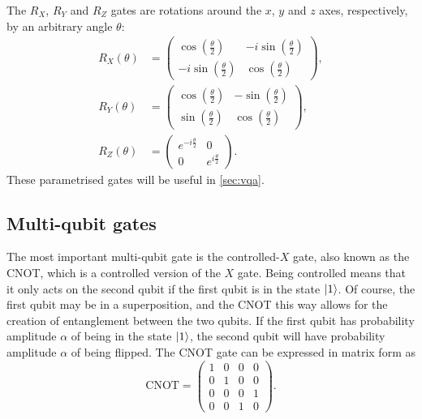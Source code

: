 The $R_X$, $R_Y$ and $R_Z$ gates are rotations around the $x$, $y$ and $z$ axes, respectively, by an arbitrary angle $\theta$:
\begin{align*}
    R_X(\theta) & = \begin{pmatrix} \cos\left(\frac{\theta}{2}\right) & -i \sin\left(\frac{\theta}{2}\right) \\ -i \sin\left(\frac{\theta}{2}\right) & \cos\left(\frac{\theta}{2}\right) \end{pmatrix}, \\
    R_Y(\theta) & = \begin{pmatrix} \cos\left(\frac{\theta}{2}\right) & -\sin\left(\frac{\theta}{2}\right) \\ \sin\left(\frac{\theta}{2}\right) & \cos\left(\frac{\theta}{2}\right) \end{pmatrix},      \\
    R_Z(\theta) & = \begin{pmatrix} e^{-i\frac{\theta}{2}} & 0 \\ 0 & e^{i\frac{\theta}{2}} \end{pmatrix}.
\end{align*}
These parametrised gates will be useful in \cref{sec:vqa}.

\subsection{Multi-qubit gates}
The most important multi-qubit gate is the controlled-$X$ gate, also known as the CNOT, which is a controlled version of the $X$ gate.
Being controlled means that it only acts on the second qubit if the first qubit is in the state $\ket{1}$.
Of course, the first qubit may be in a superposition, and the CNOT this way allows for the creation of entanglement between the two qubits.
If the first qubit has probability amplitude $\alpha$ of being in the state $\ket{1}$, the second qubit will have probability amplitude $\alpha$ of being flipped.
The CNOT gate can be expressed in matrix form as
\begin{equation}
    \text{CNOT} = \begin{pmatrix} 1 & 0 & 0 & 0 \\ 0 & 1 & 0 & 0 \\ 0 & 0 & 0 & 1 \\ 0 & 0 & 1 & 0 \end{pmatrix}.
\end{equation}

